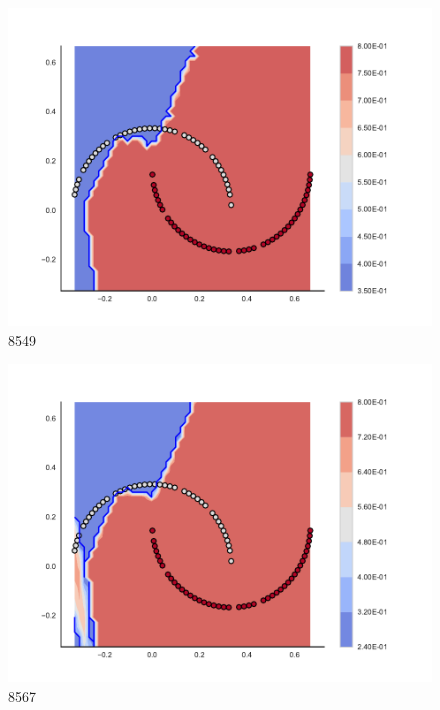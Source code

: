 \begin{subfigure}[b]{0.09\textwidth}
    \includegraphics[clip, trim=2.35cm 1.75cm 4.5cm 0cm,width=\textwidth]{img/convergence/8549.pdf}
    \caption{8549}
    \label{fig:convergence_8549}
\end{subfigure}
%
\begin{subfigure}[b]{0.09\textwidth}
    \includegraphics[clip, trim=2.35cm 1.75cm 4.5cm 0cm,width=\textwidth]{img/convergence/8567.pdf}
    \caption{8567}
    \label{fig:convergence_8567}
\end{subfigure}
%
